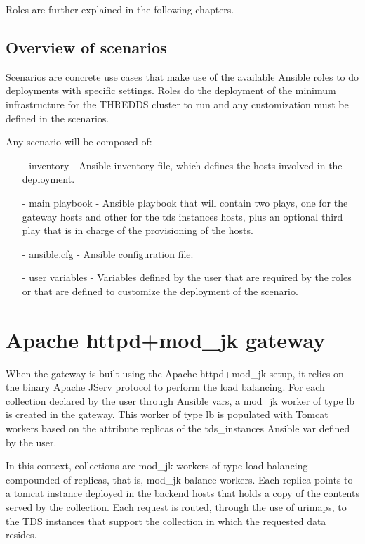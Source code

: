 \documentclass[a4paper,12pt]{article}
\begin{document}
Roles are further explained in the following chapters.

\subsection{Overview of scenarios}

Scenarios are concrete use cases that make use of the available Ansible roles to do deployments with specific settings. Roles do the deployment of the minimum infrastructure for the THREDDS cluster to run and any customization must be defined in the scenarios.

Any scenario will be composed of:

\begin{itemize}
\item[-] inventory - Ansible inventory file, which defines the hosts involved in the deployment.
\item[-] main playbook - Ansible playbook that will contain two plays, one for the gateway hosts and other for the tds instances hosts, plus an optional third play that is in charge of the provisioning of the hosts.
\item[-] ansible.cfg - Ansible configuration file.
\item[-] user variables - Variables defined by the user that are required by the roles or that are defined to customize the deployment of the scenario.
\end{itemize}

\section{Apache httpd+mod\_jk gateway}

When the gateway is built using the Apache httpd+mod\_jk setup, it relies on the binary Apache JServ protocol to perform the load balancing. For each collection declared by the user through Ansible vars, a mod\_jk worker of type lb is created in the gateway. This worker of type lb is populated with Tomcat workers based on the attribute replicas of the tds\_instances Ansible var defined by the user.

In this context, collections are mod\_jk workers of type load balancing compounded of replicas, that is, mod\_jk balance workers. Each replica points to a tomcat instance deployed in the backend hosts that holds a copy of the contents served by the collection. Each request is routed, through the use of urimaps, to the TDS instances that support the collection in which the requested data resides.
\end{document}
